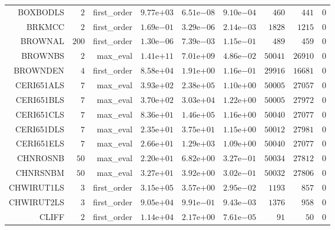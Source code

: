 \begin{longtable}{rrrrrrrrr}
BOXBODLS & \(     2\) & first\_order & \( 9.77\)e\(+03\) & \( 6.51\)e\(-08\) & \( 9.10\)e\(-04\) & \(   460\) & \(   441\) & \(     0\) \\
BRKMCC & \(     2\) & first\_order & \( 1.69\)e\(-01\) & \( 3.29\)e\(-06\) & \( 2.14\)e\(-03\) & \(  1828\) & \(  1215\) & \(     0\) \\
BROWNAL & \(   200\) & first\_order & \( 1.30\)e\(-06\) & \( 7.39\)e\(-03\) & \( 1.15\)e\(-01\) & \(   489\) & \(   459\) & \(     0\) \\
BROWNBS & \(     2\) & max\_eval & \( 1.41\)e\(+11\) & \( 7.01\)e\(+09\) & \( 4.86\)e\(-02\) & \( 50041\) & \( 26910\) & \(     0\) \\
BROWNDEN & \(     4\) & first\_order & \( 8.58\)e\(+04\) & \( 1.91\)e\(+00\) & \( 1.16\)e\(-01\) & \( 29916\) & \( 16681\) & \(     0\) \\
CERI651ALS & \(     7\) & max\_eval & \( 3.93\)e\(+02\) & \( 2.38\)e\(+05\) & \( 1.10\)e\(+00\) & \( 50005\) & \( 27057\) & \(     0\) \\
CERI651BLS & \(     7\) & max\_eval & \( 3.70\)e\(+02\) & \( 3.03\)e\(+04\) & \( 1.22\)e\(+00\) & \( 50005\) & \( 27972\) & \(     0\) \\
CERI651CLS & \(     7\) & max\_eval & \( 8.36\)e\(+01\) & \( 1.46\)e\(+05\) & \( 1.16\)e\(+00\) & \( 50040\) & \( 27077\) & \(     0\) \\
CERI651DLS & \(     7\) & max\_eval & \( 2.35\)e\(+01\) & \( 3.75\)e\(+01\) & \( 1.15\)e\(+00\) & \( 50012\) & \( 27981\) & \(     0\) \\
CERI651ELS & \(     7\) & max\_eval & \( 2.66\)e\(+01\) & \( 1.29\)e\(+03\) & \( 1.09\)e\(+00\) & \( 50040\) & \( 27077\) & \(     0\) \\
CHNROSNB & \(    50\) & max\_eval & \( 2.20\)e\(+01\) & \( 6.82\)e\(+00\) & \( 3.27\)e\(-01\) & \( 50034\) & \( 27812\) & \(     0\) \\
CHNRSNBM & \(    50\) & max\_eval & \( 3.27\)e\(+01\) & \( 3.92\)e\(+00\) & \( 3.02\)e\(-01\) & \( 50032\) & \( 27806\) & \(     0\) \\
CHWIRUT1LS & \(     3\) & first\_order & \( 3.15\)e\(+05\) & \( 3.57\)e\(+00\) & \( 2.95\)e\(-02\) & \(  1193\) & \(   857\) & \(     0\) \\
CHWIRUT2LS & \(     3\) & first\_order & \( 9.05\)e\(+04\) & \( 9.91\)e\(-01\) & \( 9.43\)e\(-03\) & \(  1376\) & \(   958\) & \(     0\) \\
CLIFF & \(     2\) & first\_order & \( 1.14\)e\(+04\) & \( 2.17\)e\(+00\) & \( 7.61\)e\(-05\) & \(    91\) & \(    50\) & \(     0\) \\

\end{longtable}
